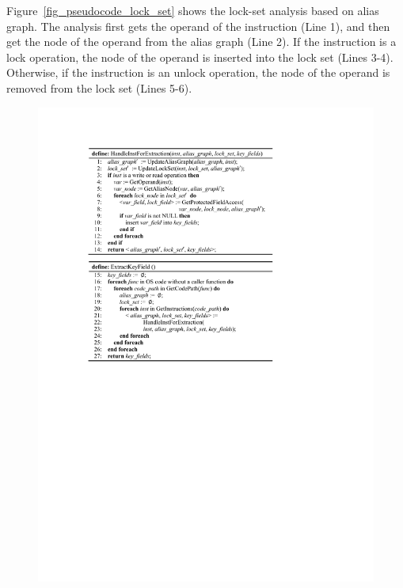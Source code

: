 Figure~\ref{fig_pseudocode_lock_set} shows the lock-set analysis based on alias 
graph. The analysis first gets the operand of the instruction (Line 1), and 
then get the node of the operand from the alias graph (Line 2). If the 
instruction is a lock operation, the node of the operand is inserted into the 
lock set (Lines 3-4). Otherwise, if the instruction is an unlock operation, the 
node of the operand is removed from the lock set (Lines 5-6).

\begin{figure}[htbp]
	\centering
	\includegraphics[width=1\linewidth]{figures/fig_pseudocode_field_extract.pdf}
	\label{fig_pseudocode_field_extract}
\end{figure}

